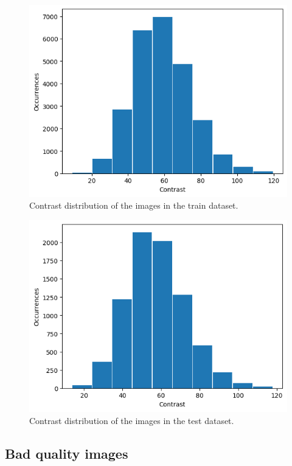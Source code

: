 \documentclass[12pt,
    brazil,			%
	english,        %
	]{article}
\begin{document}
\begin{figure}[htb]
    \centering
    \includegraphics{images/graphs/train-contrast-hist.png}
    \caption{Contrast distribution of the images in the train dataset.}
    \label{fig:contrast:training}
\end{figure}

\begin{figure}[htb]
    \centering
    \includegraphics{images/graphs/test-contrast-hist.png}
    \caption{Contrast distribution of the images in the test dataset.}
    \label{fig:contrast:testing}
\end{figure}

\subsection{Bad quality images}
\end{document}

